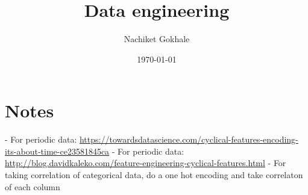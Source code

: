 \documentclass{article}
\begin{document}
\title{Data engineering}
\author{Nachiket Gokhale}
\date{\today}
\maketitle
\section{Notes}
- For periodic data: \url{https://towardsdatascience.com/cyclical-features-encoding-its-about-time-ce23581845ca}
- For periodic data: \url{http://blog.davidkaleko.com/feature-engineering-cyclical-features.html}
- For taking correlation of categorical data, do a one hot encoding and take correlaton of each column
\end{document}
